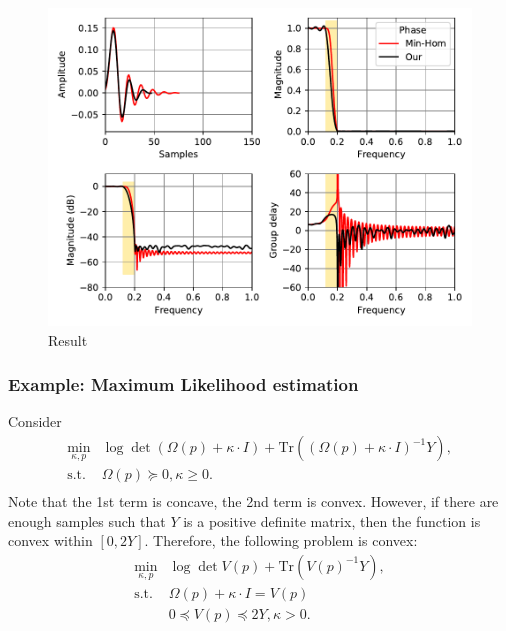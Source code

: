 \documentclass[final,leqno]{siamltex}
\begin{document}
\begin{figure}
\hypertarget{fig:lowpass}{%
\centering
\includegraphics{ellipsoid.files/lowpass.pdf}
\caption{Result}\label{fig:lowpass}
}
\end{figure}

\hypertarget{sec:example-maximum-likelihood-estimation}{%
\subsubsection{Example: Maximum Likelihood estimation}\label{sec:example-maximum-likelihood-estimation}}

Consider
\[\begin{array}{ll}
    \min_{\kappa, p}  & \log\det(\Omega(p) + \kappa\cdot I) +
                \mathrm{Tr}((\Omega(p) + \kappa\cdot I)^{-1}Y), \\
    \text{s.t.}       & \Omega(p) \succeq 0, \kappa \ge 0 . \\
  \end{array}
\]
Note that the 1st term is concave, the 2nd term is convex. However, if there are enough samples such that \(Y\) is a positive definite matrix, then the function is convex within \([0, 2Y]\).
Therefore, the following problem is convex:
\[\begin{array}{ll}
    \min_{\kappa, p}  & \log\det V(p) + \mathrm{Tr}(V(p)^{-1}Y),\\
    \text{s.t.}       & \Omega(p) + \kappa \cdot I = V(p) \\
                      & 0 \preceq V(p) \preceq 2Y, \kappa {>} 0.
  \end{array}
\]
\end{document}
